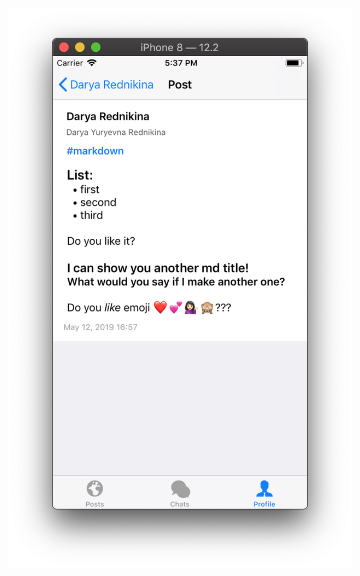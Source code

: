 \documentclass[a4paper,12pt]{article}
\begin{document}
\begin{figure}[h!]
\begin{subfigure}[b]{0.3\linewidth}
			\includegraphics[width=\linewidth]{../includes/pmi/profile_fullpost.png}
		\end{subfigure}
		\begin{subfigure}[b]{0.3\linewidth}

\end{subfigure}
\end{figure}
\end{document}
